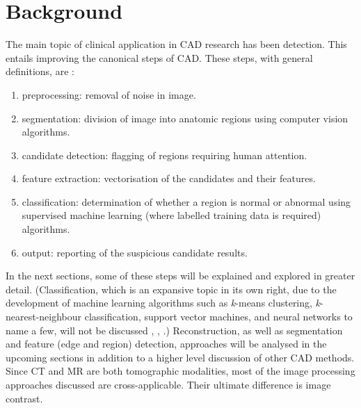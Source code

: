 \documentclass{bmcart}
\begin{document}
\section*{Background}
The main topic of clinical application in CAD research has been detection. This entails improving the canonical steps of CAD. These steps, with general definitions, are \cite{van_ginneken_computer-aided_2011}:
\begin{enumerate}
    \item preprocessing: removal of noise in image.
    \item segmentation: division of image into anatomic regions using computer vision algorithms.
    \item candidate detection: flagging of regions requiring human attention.
    \item feature extraction: vectorisation of the candidates and their features.
    \item classification: determination of whether a region is normal or abnormal using supervised machine learning (where labelled training data is required) algorithms.
    \item output: reporting of the suspicious candidate results.
\end{enumerate}
In the next sections, some of these steps will be explained and explored in greater detail. (Classification, which is an expansive topic in its own right, due to the development of machine learning algorithms such as \textit{k}-means clustering, \textit{k}-nearest-neighbour classification, support vector machines, and neural networks to name a few, will not be discussed \cite{pham_current_2000}, \cite{van_ginneken_computer-aided_2011}, \cite{sharma_automated_2010}.) Reconstruction, as well as segmentation and feature (edge and region) detection, approaches will be analysed in the upcoming sections in addition to a higher level discussion of other CAD methods. Since CT and MR are both tomographic modalities, most of the image processing approaches discussed are cross-applicable. Their ultimate difference is image contrast. 
\end{document}
